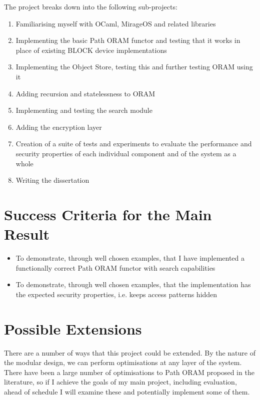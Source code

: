\documentclass[12pt,a4paper,twoside]{article}
\begin{document}
The project breaks down into the following sub-projects:

\begin{enumerate}

\item Familiarising myself with OCaml, MirageOS and related libraries

\item Implementing the basic Path ORAM functor and testing that it works in place of existing BLOCK device implementations

\item Implementing the Object Store, testing this and further testing ORAM using it

\item Adding recursion and statelessness to ORAM 

\item Implementing and testing the search module

\item Adding the encryption layer

\item Creation of a suite of tests and experiments to evaluate the performance and security properties of each individual component and of the system as a whole

\item Writing the dissertation

\end{enumerate}

\section*{Success Criteria for the Main Result}

\begin{itemize}
	\item To demonstrate, through well chosen examples, that I have implemented a functionally correct Path ORAM functor with search capabilities
	\item To demonstrate, through well chosen examples, that the implementation has the expected security properties, i.e. keeps access patterns hidden
\end{itemize}


\section*{Possible Extensions}

There are a number of ways that this project could be extended. By the nature of the modular design, we can perform optimisations at any layer of the system. There have been a large number of optimisations to Path ORAM proposed in the literature, so if I achieve the goals of my main project, including evaluation, ahead of schedule I will examine these and potentially implement some of them.
\end{document}

